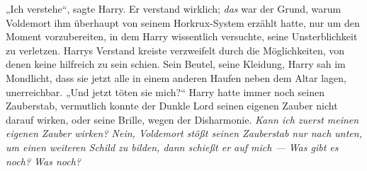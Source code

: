 „Ich verstehe“, sagte Harry.
Er verstand wirklich; \emph{das} war der Grund, warum Voldemort ihm überhaupt von seinem Horkrux-System erzählt hatte, nur um den Moment vorzubereiten, in dem Harry wissentlich versuchte, seine Unsterblichkeit zu verletzen. Harrys Verstand kreiste verzweifelt durch die Möglichkeiten, von denen keine hilfreich zu sein schien. Sein Beutel, seine Kleidung, Harry sah im Mondlicht, dass sie jetzt alle in einem anderen Haufen neben dem Altar lagen, unerreichbar.
„Und jetzt töten sie mich?“
Harry hatte immer noch seinen Zauberstab, vermutlich konnte der Dunkle Lord seinen eigenen Zauber nicht darauf wirken, oder seine Brille, wegen der Disharmonie.
\emph{Kann ich zuerst meinen eigenen Zauber wirken? Nein, Voldemort stößt seinen Zauberstab nur nach unten, um einen weiteren Schild zu bilden, dann schießt er auf mich — Was gibt es noch? \emph{Was noch?}}

